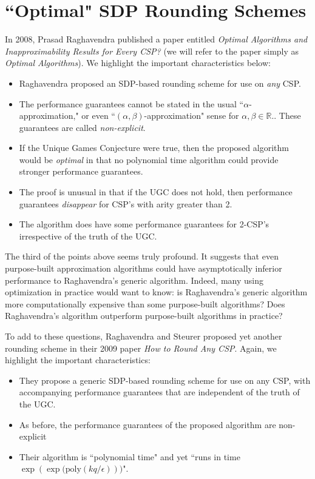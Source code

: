 \documentclass[letterpaper, 12pt]{article}
\numberwithin{equation}{section}
\begin{document}
\newpage
\section{``Optimal" SDP Rounding Schemes}\label{sec:optRoundSchemes}
In 2008, Prasad Raghavendra published a paper entitled \textit{Optimal Algorithms and Inapproximability Results for Every CSP?} (we will refer to the paper simply as \textit{Optimal Algorithms}). We highlight the important characteristics below:

\begin{itemize}
\item Raghavendra proposed an SDP-based rounding scheme for use on \textit{any} CSP.
\item The performance guarantees cannot be stated in the usual ``$\alpha$-approximation," or even ``$(\alpha,\beta)$-approximation" sense for $\alpha,\beta \in \mathbb{R}$..  These guarantees are called \textit{non-explicit}.
\item If the Unique Games Conjecture were true, then the proposed algorithm would be \textit{optimal} in that no polynomial time algorithm could provide stronger performance guarantees.
\item The proof is unusual in that if the UGC does not hold, then performance guarantees \textit{disappear} for CSP's with arity greater than 2.
\item The algorithm does have some performance guarantees for 2-CSP's irrespective of the truth of the UGC.
\end{itemize}

The third of the points above seems truly profound. It suggests that even purpose-built approximation algorithms could have asymptotically inferior performance to Raghavendra's generic algorithm. Indeed, many using optimization in practice would want to know: is Raghavendra's generic algorithm more computationally expensive than some purpose-built algorithms? Does Raghavendra's algorithm outperform purpose-built algorithms in practice? 

To add to these questions, Raghavendra and Steurer proposed yet another rounding scheme in their 2009 paper \textit{How to Round Any CSP}. Again, we highlight the important characteristics:

\begin{itemize}
\item They propose a generic SDP-based rounding scheme for use on any CSP, with accompanying performance guarantees that are independent of the truth of the UGC.
\item As before, the performance guarantees of the proposed algorithm are non-explicit
\item Their algorithm is ``polynomial time" and yet ``runs in time $\exp{(\exp{(\text{poly}(kq/\epsilon)}))}$".
\end{itemize}
\end{document}
